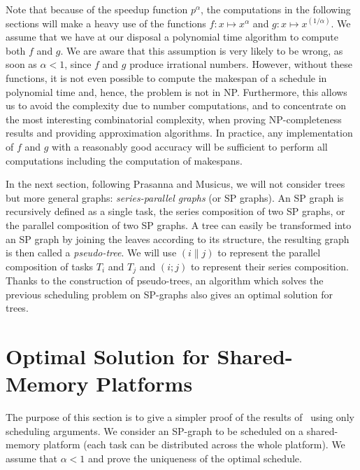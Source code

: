 \documentclass{llncs}
\newcommand{\para}[2]{#1 \mathop{\parallel} #2}
\newcommand{\seri}[2]{#1 \mathop{;} #2}
\begin{document}
Note that because of the speedup function $p^\alpha$, the computations
in the following sections will make a heavy use of the functions
$f:x\mapsto x^\alpha$ and $g:x\mapsto x^{(1/\alpha)}$. We assume that
we have at our disposal a polynomial time algorithm to compute both
$f$ and $g$. We are aware that this assumption is very likely to be
wrong, as soon as $\alpha<1$, since $f$ and $g$ produce irrational
numbers. However, without these functions, it is not even possible to
compute the makespan of a schedule in polynomial time and, hence, the
problem is not in NP. Furthermore, this allows us to avoid the
complexity due to number computations, and to concentrate on the most
interesting combinatorial complexity, when proving NP-completeness
results and providing approximation algorithms. In practice, any
implementation of $f$ and $g$ with a reasonably good accuracy will be
sufficient to perform all computations including the computation
of makespans.



In the next section, following Prasanna and Musicus, we will not
consider trees but more general graphs: \emph{series-parallel graphs}
(or SP graphs). An SP graph is recursively defined as a single task,
the series composition of two SP graphs, or the parallel composition
of two SP graphs. A tree can easily be transformed into an SP graph by joining the
leaves according to its structure, the resulting graph is then called a \emph{pseudo-tree}.  We will use
$(\para ij)$ to represent the parallel composition of tasks $T_i$ and
$T_j$ and $(\seri ij)$ to represent their series composition. 
Thanks to the construction of pseudo-trees, an algorithm which solves
the previous scheduling problem on SP-graphs also gives an optimal
solution for trees.





\section{Optimal Solution for Shared-Memory Platforms}

\label{sec:shared}





The purpose of this section is to give a simpler proof of the results
of~\cite{prasmus,prasmus2} using only scheduling arguments. We
consider an SP-graph to be scheduled on a shared-memory platform
(each task can be distributed across the whole platform). We assume
that $\alpha<1$ and prove the uniqueness of 
 the optimal schedule.
\end{document}

